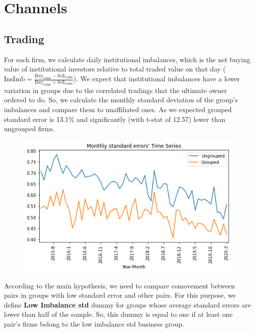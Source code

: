 \documentclass[12pt, a4paper]{article}
\begin{document}
\newpage

\section*{Channels} 
\subsection*{Trading}
 
For each firm, we calculate daily institutional imbalances, which is the net buying value of institutional investors relative to total traded value on that day ($ \text{InsImb} = \frac{\text{Buy}_{\text{value}} - \text{Sell}_{\text{value}}}{\text{Buy}_{\text{value}} + \text{Sell}_{\text{value}}} $). 
We expect that institutional imbalances have a lower variation in groups due to the correlated tradings that the ultimate owner ordered to do. So, we calculate the monthly standard deviation of the group's imbalances and compare them to unaffiliated ones. As we expected grouped standard error is  13.1\% and significantly (with t-stat of 12.57) lower than ungrouped firms. 

\begin{table}[htbp]
	\centering
	\resizebox{0.75\textwidth}{!}{

}
	\label{tab:addlabel}%
\end{table}%



\begin{figure}[htbp]
	\centering
	\includegraphics[width=0.8\linewidth]{GroupedSTD}
	\label{fig:groupedstd}
\end{figure}

According to the main hypothesis, we need to compare comovement between pairs in groups with low standard error and other pairs.
 For this purpose, we define \textbf{Low Imbalance std} dummy for groups whose average standard errors are lower than half of the sample. 
So, this dummy is equal to one if at least one pair's firms belong to the low imbalance std business group.
\begin{table}[htbp]
	\centering
	\resizebox{\textwidth}{!}{
		
	}
\end{table}
\FloatBarrier
\end{document}
